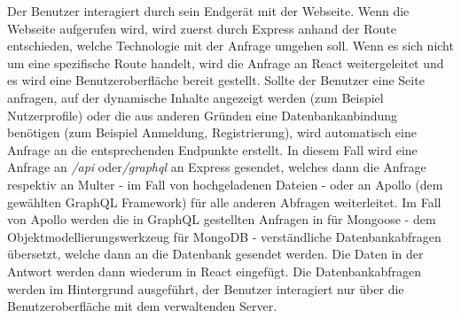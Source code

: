 Der Benutzer interagiert durch sein Endgerät mit der Webseite. Wenn die Webseite aufgerufen wird, wird zuerst durch Express anhand der Route entschieden, welche Technologie mit der Anfrage umgehen soll. Wenn es sich nicht um eine spezifische Route handelt, wird die Anfrage an React weitergeleitet und es wird eine Benutzeroberfläche bereit gestellt. Sollte der Benutzer eine Seite anfragen, auf der dynamische Inhalte angezeigt werden (zum Beispiel Nutzerprofile) oder die aus anderen Gründen eine Datenbankanbindung benötigen (zum Beispiel Anmeldung, Registrierung), wird automatisch eine Anfrage an die entsprechenden Endpunkte erstellt. In diesem Fall wird eine Anfrage an \textit{/api} oder\textit{/graphql} an Express gesendet, welches dann die Anfrage respektiv an Multer - im Fall von hochgeladenen Dateien - oder an Apollo (dem gewählten GraphQL Framework) für alle anderen Abfragen weiterleitet. Im Fall von Apollo werden die in GraphQL gestellten Anfragen in für Mongoose - dem Objektmodellierungswerkzeug für MongoDB - verständliche Datenbankabfragen übersetzt, welche dann an die Datenbank gesendet werden. Die Daten in der Antwort werden dann wiederum in React eingefügt. Die Datenbankabfragen werden im Hintergrund ausgeführt, der Benutzer interagiert nur über die Benutzeroberfläche mit dem verwaltenden Server.